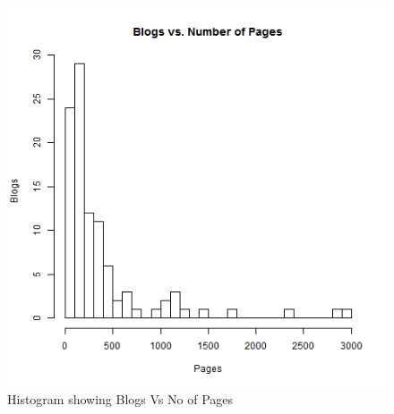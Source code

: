 



\newpage



\newpage


\newpage


\begin{figure}[ht]    
    \begin{center}
        \includegraphics[scale=0.60]{questions/q1/R/q1-histogram1.png}
        \caption{Histogram showing Blogs Vs No of Pages}
        \label{Histogram 1}
    \end{center}
\end{figure}

\newpage